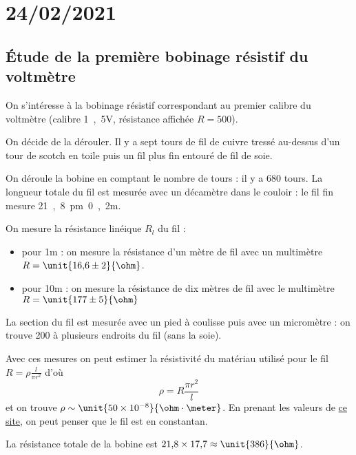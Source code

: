 \documentclass[fleqn,12pt,a4paper]{article}
\begin{document}
\section*{24/02/2021}

\subsection*{Étude de la première bobinage résistif du voltmètre}

On s'intéresse à la bobinage résistif correspondant au premier calibre du voltmètre (calibre \unit{1{,}5}{V}, résistance affichée $R = 500$).

On décide de la dérouler.
Il y a sept tours de fil de cuivre tressé au-dessus d'un tour de scotch en toile puis un fil plus fin entouré de fil de soie.

On déroule la bobine en comptant le nombre de tours : il y a 680 tours.
La longueur totale du fil est mesurée avec un décamètre dans le couloir : le fil fin mesure \unit{21{,}8\pm 0{,}2}{m}.

On mesure la résistance linéique $R_l$ du fil :
\begin{itemize}
\item pour \unit{1}{m} : on mesure la résistance d'un mètre de fil avec un multimètre $ R = \unit{16{,}6 \pm 2}{\ohm}$.
\item pour \unit{10}{m} : on mesure la résistance de dix mètres de fil avec le multimètre $ R = \unit{177 \pm 5}{\ohm} $
\end{itemize}

La section du fil est mesurée avec un pied à coulisse puis avec un micromètre : on trouve \unit{200}{\micro\metre} à plusieurs endroits du fil (sans la soie).

Avec ces mesures on peut estimer la résistivité du matériau utilisé pour le fil $ R = \rho \frac{l}{\pi r^2} $ d'où
\[
\rho = R \frac{\pi r^2}{l}
\]
et on trouve $\rho \sim \unit{50 \times 10^{-8}}{\ohm\cdot\meter}$.
En prenant les valeurs de \href{https://webetab.ac-bordeaux.fr/Pedagogie/Physique/Physico/Electro/e07fil.htm}{ce site}, on peut penser que le fil est en constantan.

La résistance totale de la bobine est $21{,}8 \times 17{,}7 \approx \unit{386}{\ohm}$.
\end{document}
